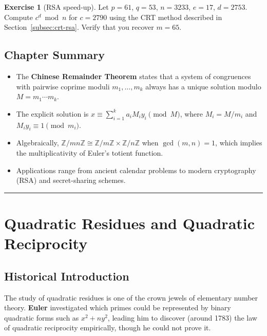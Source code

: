 \documentclass[12pt,a4paper,openany]{book}
\theoremstyle{definition}
\newtheorem{exercise}{Exercise}[chapter]
\theoremstyle{plain}
\theoremstyle{remark}
\newcommand{\Z}{\mathbb{Z}}
\begin{document}
\begin{exercise}[RSA speed-up]
\label{exer:crt-rsa}
Let $p = 61$, $q = 53$, $n = 3233$, $e = 17$, $d = 2753$.
Compute $c^d \bmod n$ for $c = 2790$ using the CRT method described in
Section~\ref{subsec:crt-rsa}. Verify that you recover $m = 65$.
\end{exercise}

\section*{Chapter Summary}

\begin{itemize}
  \item The \textbf{Chinese Remainder Theorem} states that a system of congruences
    with pairwise coprime moduli $m_1, \ldots, m_k$ always has a unique solution
    modulo $M = m_1 \cdots m_k$.

  \item The explicit solution is
    $x \equiv \sum_{i=1}^k a_i M_i y_i \pmod{M}$, where $M_i = M/m_i$ and
    $M_i y_i \equiv 1 \pmod{m_i}$.

  \item Algebraically, $\Z/mn\Z \cong \Z/m\Z \times \Z/n\Z$ when $\gcd(m,n)=1$,
    which implies the multiplicativity of Euler's totient function.

  \item Applications range from ancient calendar problems to modern cryptography (RSA)
    and secret-sharing schemes.
\end{itemize}

\bigskip
\hrule
\bigskip

\chapter{Quadratic Residues and Quadratic Reciprocity}
\label{ch:qr}

\section*{Historical Introduction}

The study of quadratic residues is one of the crown jewels of elementary number theory.
\textbf{Euler} investigated which primes could be represented by
binary quadratic forms such as $x^2 + ny^2$, leading him to discover (around 1783)
the law of quadratic reciprocity empirically, though he could not prove it.
\end{document}
